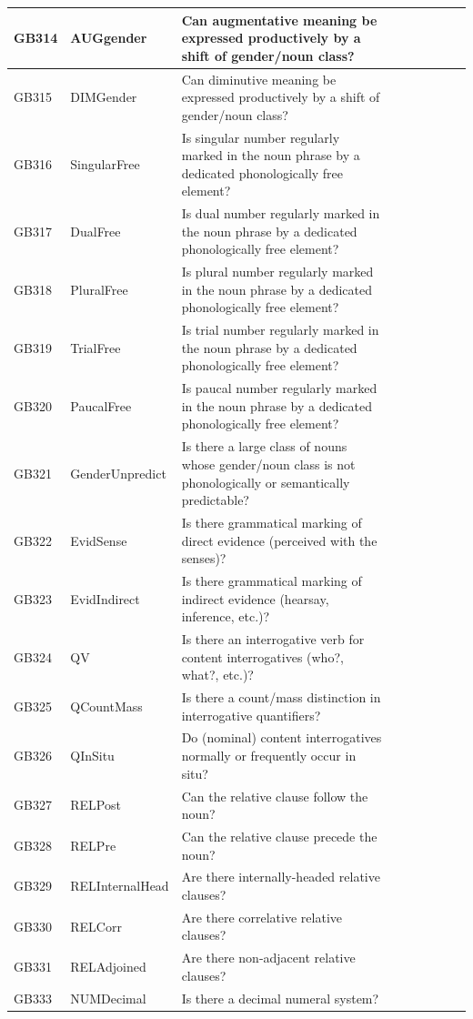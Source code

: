 \documentclass[draft,10pt]{article} %
\begin{document}
\begin{landscape}
\begin{longtable}{| l | p{4cm}| p{12cm}|p{2cm}|p{2cm}|p{2cm}|p{2cm}|p{2cm}|p{2cm}|}
GB314 & AUGgender&Can augmentative meaning be expressed productively by a shift of gender/noun class?\\ \hline
GB315 & DIMGender&Can diminutive meaning be expressed productively by a shift of gender/noun class?\\ \hline
GB316 & SingularFree&Is singular number regularly marked in the noun phrase by a dedicated phonologically free element?\\ \hline
GB317 & DualFree&Is dual number regularly marked in the noun phrase by a dedicated phonologically free element?\\ \hline
GB318 & PluralFree&Is plural number regularly marked in the noun phrase by a dedicated phonologically free element?\\ \hline
GB319 & TrialFree&Is trial number regularly marked in the noun phrase by a dedicated phonologically free element?\\ \hline
GB320 & PaucalFree&Is paucal number regularly marked in the noun phrase by a dedicated phonologically free element?\\ \hline
GB321 & GenderUnpredict&Is there a large class of nouns whose gender/noun class is not phonologically or semantically predictable?\\ \hline
GB322 & EvidSense&Is there grammatical marking of direct evidence (perceived with the senses)?\\ \hline
GB323 & EvidIndirect&Is there grammatical marking of indirect evidence (hearsay, inference, etc.)?\\ \hline
GB324 & QV&Is there an interrogative verb for content interrogatives (who?, what?, etc.)?\\ \hline
GB325 & QCountMass&Is there a count/mass distinction in interrogative quantifiers?\\ \hline
GB326 & QInSitu&Do (nominal) content interrogatives normally or frequently occur in situ?\\ \hline
GB327 & RELPost&Can the relative clause follow the noun?\\ \hline
GB328 & RELPre&Can the relative clause precede the noun?\\ \hline
GB329 & RELInternalHead&Are there internally-headed relative clauses?\\ \hline
GB330 & RELCorr&Are there correlative relative clauses?\\ \hline
GB331 & RELAdjoined&Are there non-adjacent relative clauses?\\ \hline
GB333 & NUMDecimal&Is there a decimal numeral system?\\ \hline

\end{longtable}
\end{landscape}
\end{document}
